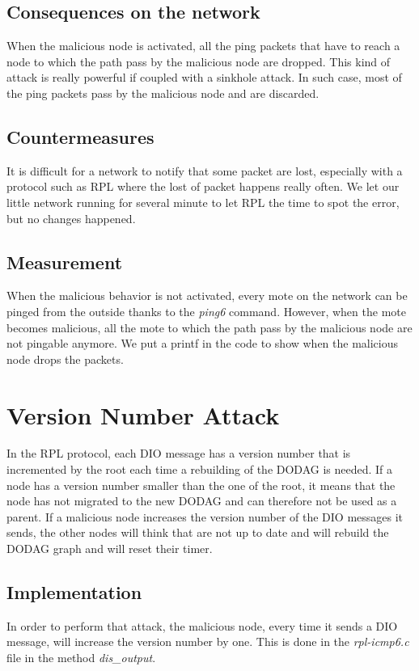 \documentclass{report}
\begin{document}
\subsection*{Consequences on the network}
When the malicious node is activated, all the ping packets that have to reach a node to which the path pass by the malicious node are dropped. This kind of attack is really powerful if coupled with a sinkhole attack. In such case, most of the ping packets pass by the malicious node and are discarded. 
\subsection*{Countermeasures}
It is difficult for a network to notify that some packet are lost, especially with a protocol such as RPL where the lost of packet happens really often. We let our little network running for several minute to let RPL the time to spot the error, but no changes happened.

\subsection*{Measurement }
When the malicious behavior is not activated, every mote on the network can be pinged from the outside thanks to the \textit{ping6} command. However, when the mote becomes malicious, all the mote to which the path pass by the malicious node are not pingable anymore. We put a printf in the code to show when the malicious node drops the packets. 

\section{Version Number Attack}
In the RPL protocol, each DIO message has a version number that is incremented by the root each time a rebuilding of the DODAG is needed. If a node has a version number smaller than the one of the root, it means that the node has not migrated to the new DODAG and can therefore not be used as a parent. If a malicious node increases the version number of the DIO messages it sends, the other nodes will think that are not up to date and will rebuild the DODAG graph and will reset their timer.

\subsection*{Implementation}
In order to perform that attack, the malicious node, every time it sends a DIO message, will increase the version number by one. This is done in the \textit{rpl-icmp6.c} file in the method \textit{dis\_output}.
\end{document}
